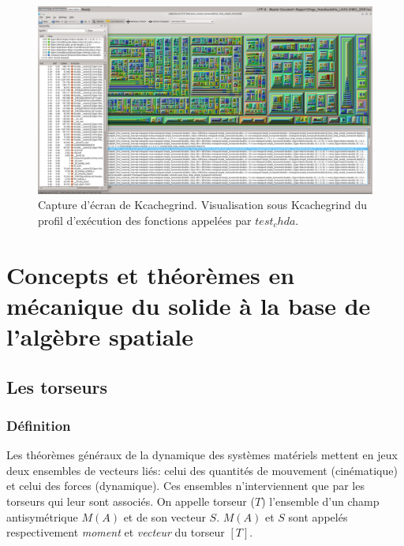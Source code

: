 \begin{figure}[H]
  \begin{center}
  \includegraphics[width=\textwidth]{figs/snapshotKcachegrind1.png}
  \caption{Capture d'écran de Kcachegrind. Visualisation sous Kcachegrind du profil d'exécution des fonctions appelées par $test_chda$.}         %
  \label{fig:Kcachegrind1} %
  \end{center}
\end{figure}



\chapter{Concepts et théorèmes en mécanique du solide à la base de l'algèbre spatiale} \label{appx_torseursToalgSpa}

\section{Les torseurs} \label{appx_torseursToalgSpa_torseurs}


\subsection{Définition} \label{appx_torseursToalgSpa_torseurs_def}
Les théorèmes généraux de la dynamique des systèmes matériels mettent en jeux deux ensembles de vecteurs liés: celui des quantités de mouvement (cinématique) et celui des forces (dynamique). Ces ensembles n'interviennent que par les torseurs qui leur sont associés. On appelle torseur ($T$) l'ensemble d'un champ antisymétrique $M(A)$ et de son vecteur $S$. $M(A)$ et $S$ sont appelés respectivement \emph{moment} et \emph{vecteur} du torseur $[T]$.

